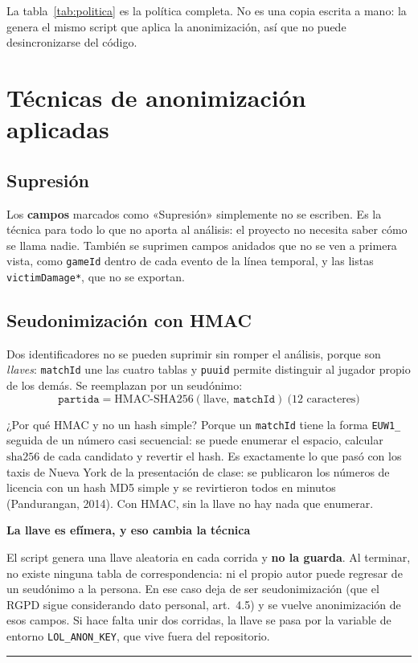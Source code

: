 \documentclass[11pt,letterpaper]{article}
\newenvironment{respuesta}[1]
  {\par\medskip\setlength{\fboxsep}{10pt}%
   \begin{lrbox}{\cajaresp}%
   \begin{minipage}{\dimexpr\linewidth-2\fboxsep-3pt\relax}%
   \color{tinta}\textcolor{azul}{\textbf{#1}}\par\smallskip\ignorespaces}
  {\end{minipage}%
   \end{lrbox}%
   \noindent\textcolor{azul}{\rule[-\dp\cajaresp]{3pt}{\dimexpr\ht\cajaresp+\dp\cajaresp\relax}}%
   \colorbox{papel}{\usebox{\cajaresp}}\par\medskip}
\newcommand{\dato}[1]{\textbf{\textcolor{azul}{#1}}}
\begin{document}
\noindent La tabla~\ref{tab:politica} es la política completa. No es una copia
escrita a mano: la genera el mismo script que aplica la anonimización, así que no
puede desincronizarse del código.



\section{Técnicas de anonimización aplicadas}

\subsection{Supresión}
Los \dato{\nSuprimidos{} campos} marcados como «Supresión» simplemente no se
escriben. Es la técnica para todo lo que no aporta al análisis: el proyecto no
necesita saber cómo se llama nadie. También se suprimen campos anidados que no se
ven a primera vista, como \texttt{gameId} dentro de cada evento de la línea
temporal, y las listas \texttt{victimDamage*}, que no se exportan.

\subsection{Seudonimización con HMAC}
Dos identificadores no se pueden suprimir sin romper el análisis, porque son
\emph{llaves}: \texttt{matchId} une las cuatro tablas y \texttt{puuid} permite
distinguir al jugador propio de los demás. Se reemplazan por un seudónimo:
\[
  \texttt{partida} = \mathrm{HMAC\text{-}SHA256}(\text{llave},\ \texttt{matchId})\ \text{(12 caracteres)}
\]

\noindent ¿Por qué HMAC y no un hash simple? Porque un \texttt{matchId} tiene la
forma \texttt{EUW1\_} seguida de un número casi secuencial: se puede enumerar el
espacio, calcular \(\mathrm{sha256}\) de cada candidato y revertir el hash. Es
exactamente lo que pasó con los taxis de Nueva York de la presentación de clase: se
publicaron los números de licencia con un hash MD5 simple y se revirtieron todos en
minutos (Pandurangan, 2014). Con HMAC, sin la llave no hay nada que enumerar.

\begin{respuesta}{La llave es efímera, y eso cambia la técnica}
El script genera una llave aleatoria en cada corrida y \textbf{no la guarda}. Al
terminar, no existe ninguna tabla de correspondencia: ni el propio autor puede
regresar de un seudónimo a la persona. En ese caso deja de ser seudonimización
(que el RGPD sigue considerando dato personal, art.~4.5) y se vuelve anonimización
de esos campos. Si hace falta unir dos corridas, la llave se pasa por la variable
de entorno \texttt{LOL\_ANON\_KEY}, que vive fuera del repositorio.
\end{respuesta}
\end{document}
